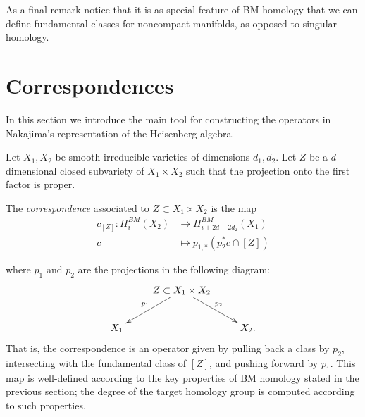 \noindent
As a final remark notice that it is
as special feature of BM homology
that we can define fundamental classes for
noncompact manifolds, as opposed to
singular homology.

\section{Correspondences}
\label{section-correspondences}

\noindent
In this section we introduce the main tool
for constructing the operators in Nakajima's
representation
of the Heisenberg algebra.

\medskip\noindent
Let $X_1,X_2$ be smooth irreducible varieties
of dimensions $d_1,d_2$.
Let $Z$ be a $d$-dimensional
closed subvariety of $X_1\times X_2$
such that the projection onto the first
factor
is proper.

The {\it correspondence} associated to $Z
\subset X_1\times X_2$
is the map
\begin{equation}
\label{equation-correspondence}
\begin{aligned}
c_{[Z]}:H_i^{BM}(X_2)&\longrightarrow
H_{i+2d-2d_2}^{BM}(X_1)\\
c&\longmapsto p_{1,*}(p_2^*c\cap [Z])
\end{aligned}
\end{equation}

\noindent
where $p_1$ and $p_2$ are the projections in
the following diagram:
$$
\xymatrix{
&Z\ar[ld]_{p_1}\ar[rd]^{p_2} \subset
X_1\times X_2\\
X_1&&X_2.
}
$$
\noindent
That is, the correspondence is an operator
given by pulling back a class by $p_2$,
intersecting with the fundamental class of
$[Z]$,
and pushing forward by $p_1$.
This map is well-defined according
to the key properties of BM homology stated
in the previous section;
the degree of the target homology group is
computed according
to such properties.

